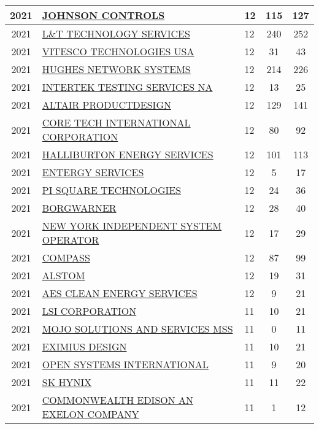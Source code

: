 \documentclass{article}%
\begin{document}
\begin{longtable}{c|p{20em}|p{5em}|c|c}
2021&\hyperref[subsec:JOHNSONCONTROLS]{JOHNSON CONTROLS}&12&115&127\\%
\hline%
2021&\hyperref[subsec:LTTECHNOLOGYSERVICES]{L\&T TECHNOLOGY SERVICES}&12&240&252\\%
\hline%
2021&\hyperref[subsec:VITESCOTECHNOLOGIESUSA]{VITESCO TECHNOLOGIES USA}&12&31&43\\%
\hline%
2021&\hyperref[subsec:HUGHESNETWORKSYSTEMS]{HUGHES NETWORK SYSTEMS}&12&214&226\\%
\hline%
2021&\hyperref[subsec:INTERTEKTESTINGSERVICESNA]{INTERTEK TESTING SERVICES NA}&12&13&25\\%
\hline%
2021&\hyperref[subsec:ALTAIRPRODUCTDESIGN]{ALTAIR PRODUCTDESIGN}&12&129&141\\%
\hline%
2021&\hyperref[subsec:CORETECHINTERNATIONALCORPORATION]{CORE TECH INTERNATIONAL CORPORATION}&12&80&92\\%
\hline%
2021&\hyperref[subsec:HALLIBURTONENERGYSERVICES]{HALLIBURTON ENERGY SERVICES}&12&101&113\\%
\hline%
2021&\hyperref[subsec:ENTERGYSERVICES]{ENTERGY SERVICES}&12&5&17\\%
\hline%
2021&\hyperref[subsec:PISQUARETECHNOLOGIES]{PI SQUARE TECHNOLOGIES}&12&24&36\\%
\hline%
2021&\hyperref[subsec:BORGWARNER]{BORGWARNER}&12&28&40\\%
\hline%
2021&\hyperref[subsec:NEWYORKINDEPENDENTSYSTEMOPERATOR]{NEW YORK INDEPENDENT SYSTEM OPERATOR}&12&17&29\\%
\hline%
2021&\hyperref[subsec:COMPASS]{COMPASS}&12&87&99\\%
\hline%
2021&\hyperref[subsec:ALSTOM]{ALSTOM}&12&19&31\\%
\hline%
2021&\hyperref[subsec:AESCLEANENERGYSERVICES]{AES CLEAN ENERGY SERVICES}&12&9&21\\%
\hline%
2021&\hyperref[subsec:LSICORPORATION]{LSI CORPORATION}&11&10&21\\%
\hline%
2021&\hyperref[subsec:MOJOSOLUTIONSANDSERVICESMSS]{MOJO SOLUTIONS AND SERVICES MSS}&11&0&11\\%
\hline%
2021&\hyperref[subsec:EXIMIUSDESIGN]{EXIMIUS DESIGN}&11&10&21\\%
\hline%
2021&\hyperref[subsec:OPENSYSTEMSINTERNATIONAL]{OPEN SYSTEMS INTERNATIONAL}&11&9&20\\%
\hline%
2021&\hyperref[subsec:SKHYNIX]{SK HYNIX}&11&11&22\\%
\hline%
2021&\hyperref[subsec:COMMONWEALTHEDISONANEXELONCOMPANY]{COMMONWEALTH EDISON AN EXELON COMPANY}&11&1&12\\%

\end{longtable}
\end{document}
